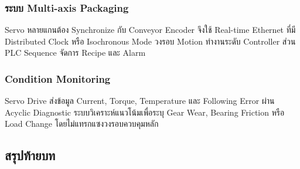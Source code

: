\subsubsection{ระบบ Multi-axis Packaging}

Servo หลายแกนต้อง Synchronize กับ Conveyor Encoder จึงใช้ Real-time Ethernet ที่มี Distributed Clock หรือ Isochronous Mode วงรอบ Motion ทำงานระดับ Controller ส่วน PLC Sequence จัดการ Recipe และ Alarm

\subsubsection{Condition Monitoring}

Servo Drive ส่งข้อมูล Current, Torque, Temperature และ Following Error ผ่าน Acyclic Diagnostic ระบบวิเคราะห์แนวโน้มเพื่อระบุ Gear Wear, Bearing Friction หรือ Load Change โดยไม่แทรกแซงวงรอบควบคุมหลัก



\subsection{สรุปท้ายบท}

